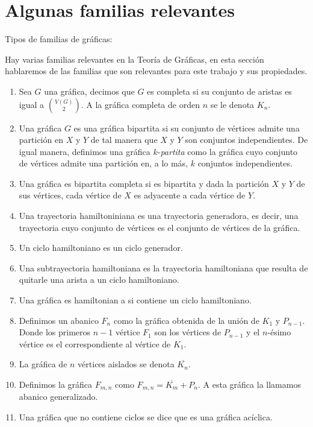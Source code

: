 \section{Algunas familias relevantes}
\label{sec:famGraf}
\begin{definicion} Tipos de familias de gr\'aficas:
    \label{def:familias}

    Hay varias familias relevantes en la Teor\'ia de Gr\'aficas, en esta
    secci\'on hablaremos de las familias que son relevantes para este trabajo y
    sus propiedades. 
    \begin{enumerate}
        \item Sea $G$ una gr\'afica, decimos que $G$ es completa si su conjunto
        de aristas es igual a $\binom{V(G)}{2}$. A la gr\'afica completa de
        orden $n$ se le denota $K_n$.
        \item Una gr\'afica $G$ es una gr\'afica bipartita si su conjunto de
        v\'ertices admite una partici\'on en $X$ y $Y$ de tal manera que $X$ y
        $Y$ son conjuntos independientes. De igual manera, definimos una
        gr\'afica $k$-\textit{partita} como la gr\'afica cuyo conjunto de
        v\'ertices admite una partici\'on en, a lo m\'as, $k$ conjuntos
        independientes.
        \item Una gr\'afica es bipartita completa si es bipartita y dada la
        partici\'on $X$ y $Y$ de sus v\'ertices, cada v\'ertice de $X$ es
        adyacente a cada v\'ertice de $Y$. 
        \item Una trayectoria hamiltoniniana es una trayectoria generadora, es
        decir, una trayectoria cuyo conjunto de v\'ertices es el conjunto de
        v\'ertices de la gr\'afica. 
        \item Un ciclo hamiltoniano es un ciclo generador. 
        \item Una subtrayectoria hamiltoniana es la trayectoria hamiltoniana que
        resulta de quitarle una arista a un ciclo hamiltoniano.
        \item Una gr\'afica es hamiltonian a si contiene un ciclo hamiltoniano. 
        \item Definimos un abanico $F_n$ como la gr\'afica obtenida de la
        uni\'on de $K_1$ y $P_{n-1}$. Donde los primeros $n-1$ v\'ertice $F_1$
        son los v\'ertices de $P_{n-1}$ y el $n$-\'esimo v\'ertice es el
        correspondiente al v\'ertice de $K_1$.
        \item La gr\'afica de $n$ v\'ertices aislados se denota $\overline{K_n}$.
        \item Definimos la gr\'afica $F_{m,n}$ como
        $F_{m,n}=\overline{K_m}+P_n$. A esta gr\'afica la llamamos abanico
        generalizado.
        \item Una gr\'afica que no contiene ciclos se dice que es una gr\'afica
        ac\'iclica.
    \end{enumerate}
\end{definicion}



